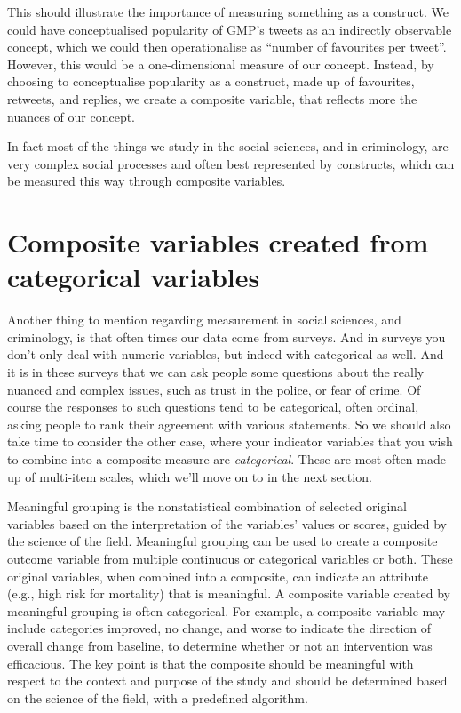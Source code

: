 \documentclass[
]{book}
\begin{document}
This should illustrate the importance of measuring something as a construct. We could have conceptualised popularity of GMP's tweets as an indirectly observable concept, which we could then operationalise as ``number of favourites per tweet''. However, this would be a one-dimensional measure of our concept. Instead, by choosing to conceptualise popularity as a construct, made up of favourites, retweets, and replies, we create a composite variable, that reflects more the nuances of our concept.

In fact most of the things we study in the social sciences, and in criminology, are very complex social processes and often best represented by constructs, which can be measured this way through composite variables.

\hypertarget{composite-variables-created-from-categorical-variables}{%
\section{Composite variables created from categorical variables}\label{composite-variables-created-from-categorical-variables}}

Another thing to mention regarding measurement in social sciences, and criminology, is that often times our data come from surveys. And in surveys you don't only deal with numeric variables, but indeed with categorical as well. And it is in these surveys that we can ask people some questions about the really nuanced and complex issues, such as trust in the police, or fear of crime. Of course the responses to such questions tend to be categorical, often ordinal, asking people to rank their agreement with various statements. So we should also take time to consider the other case, where your indicator variables that you wish to combine into a composite measure are \emph{categorical}. These are most often made up of multi-item scales, which we'll move on to in the next section.

Meaningful grouping is the nonstatistical combination of selected original variables based on the interpretation of the variables' values or scores, guided by the science of the field. Meaningful grouping can be used to create a composite outcome variable from multiple continuous or categorical variables or both. These original variables, when combined into a composite, can indicate an attribute (e.g., high risk for mortality) that is meaningful. A composite variable created by meaningful grouping is often categorical. For example, a composite variable may include categories improved, no change, and worse to indicate the direction of overall change from baseline, to determine whether or not an intervention was efficacious. The key point is that the composite should be meaningful with respect to the context and purpose of the study and should be determined based on the science of the field, with a predefined algorithm.
\end{document}
